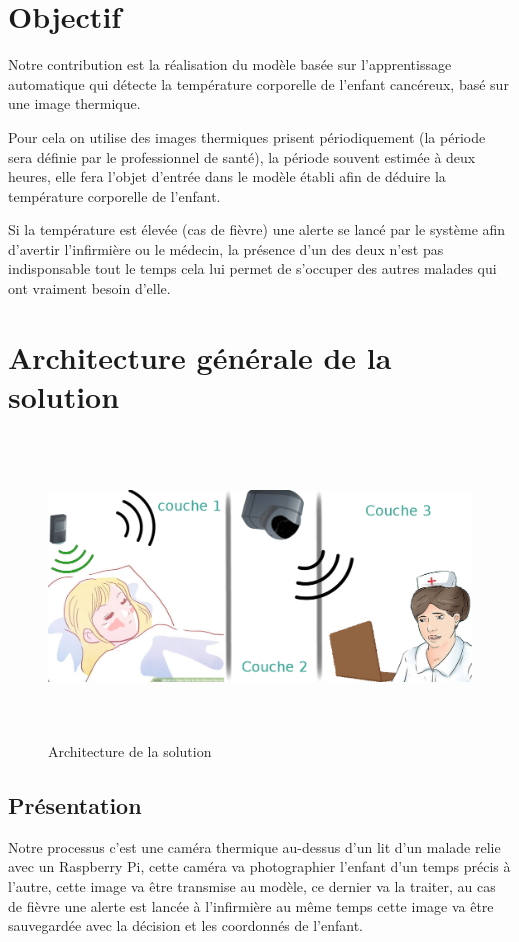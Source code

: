 \documentclass[12pt]{article}
\begin{document}
\section{Objectif}
Notre contribution est la réalisation du modèle basée sur l’apprentissage automatique qui détecte la température corporelle de l'enfant cancéreux, basé sur une image thermique.

Pour cela on utilise des images thermiques prisent périodiquement (la période sera définie par le professionnel de santé), la période souvent estimée à deux heures, elle fera l’objet d’entrée dans le modèle établi afin de déduire la température corporelle de l’enfant.

Si la température est élevée (cas de fièvre) une alerte se lancé par le système afin d’avertir l'infirmière ou le médecin, la présence d'un des deux n'est pas indisponsable tout le temps cela lui permet de s’occuper des autres malades qui ont vraiment besoin d’elle.
\section{Architecture générale de la solution}
\begin{figure}[h]
	\centering
	\includegraphics[height=8cm,width=15cm]{img-Chapiter-3/processus.png}
	\caption{Architecture de la solution}
	\label{fig:archgene}
\end{figure}
\newpage
\subsection{Présentation}
Notre processus c’est une caméra thermique au-dessus d’un lit d’un malade relie avec un Raspberry Pi, cette caméra va photographier l’enfant d'un temps précis à l'autre, cette image va être transmise au modèle, ce dernier va la traiter, au cas de fièvre une alerte est lancée à l’infirmière au même temps cette image va être sauvegardée avec la décision et les coordonnés de l’enfant.
\end{document}
